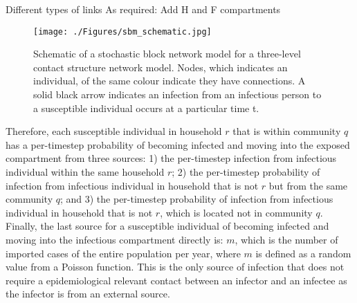 \documentclass[a4paper]{article}
\begin{document}
	Different types of links
	As required: Add H and F compartments
	
	\begin{figure}[!ht]
		\begin{center}	
			\texttt{[image: ./Figures/sbm\_schematic.jpg]} 
		\end{center}
		\caption[Schematic of a three-level contact structure network model with three small clusters  in each larger cluster at a particular time point]{Schematic of a stochastic block network model for a three-level contact structure network model. Nodes, which indicates an individual, of the same colour indicate they have connections. A solid black arrow indicates an infection from an infectious person to a susceptible individual occurs at a particular time t.}
		\label{fig:sbm}
	\end{figure}
	
	Therefore, each susceptible individual in household $r$ that is within community $q$ has a per-timestep probability of becoming infected and moving into the exposed compartment from three sources: 1) the per-timestep infection from infectious individual within the same household $r$; 2) the per-timestep probability of infection from infectious individual in household that is not $r$ but from the same community $q$; and 3) the per-timestep probability of infection from infectious individual in household that is not $r$, which is located not in community $q$. Finally, the last source for a susceptible individual of becoming infected and moving into the infectious compartment directly is: $m$, which is the number of imported cases of the entire population per year, where $m$ is defined as a random value from a Poisson function. This is the only source of infection that does not require a epidemiological relevant contact between an infector and an infectee as the infector is from an external source.
	
\end{document}
